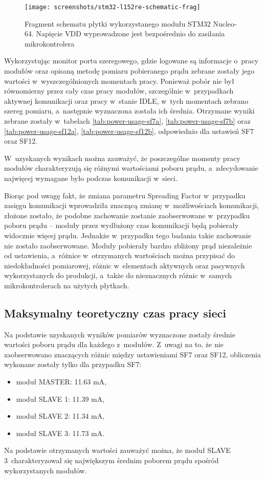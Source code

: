 \begin{figure}[!htbp]
    \centering
    \texttt{[image: screenshots/stm32-l152re-schematic-frag]}
    \caption{\label{img:stm32-l152re-schematic-frag}Fragment schematu płytki wykorzystanego modułu STM32 Nucleo-64.
        Napięcie VDD wyprowadzone jest bezpośrednio do zasilania mikrokontrolera}
\end{figure}

\FloatBarrier

Wykorzystując monitor portu szeregowego, gdzie logowane są informacje o~pracy modułów oraz opisaną metodę pomiaru
pobieranego prądu zebrane zostały jego wartości w~wyszczególnionych momentach pracy. Ponieważ pobór nie był równomierny
przez cały czas pracy modułów, szczególnie w~przypadkach aktywnej komunikacji oraz pracy w~stanie IDLE, w~tych momentach
zebrano szereg pomiaru, a~następnie wyznaczona została ich średnia. Otrzymane wyniki zebrane zostały w~tabelach
\ref{tab:power-usage-sf7a}, \ref{tab:power-usage-sf7b} oraz \ref{tab:power-usage-sf12a}, \ref{tab:power-usage-sf12b},
odpowiednio dla ustawień SF7 oraz SF12.




\FloatBarrier
W~uzyskanych wynikach można zauważyć, że poszczególne momenty pracy modułów charakteryzują się różnymi wartościami
poboru prądu, a~zdecydowanie najwięcej wymagane było podczas komunikacji w~sieci.

Biorąc pod uwagę fakt, że zmiana parametru Spreading Factor w~przypadku zasięgu komunikacji wprowadziła znaczącą zmianę
w~możliwościach komunikacji, złożone zostało, że podobne zachowanie zostanie zaobserwowane w~przypadku poboru prądu --
moduły przez wydłużony czas komunikacji będą pobierały widocznie więcej prądu. Jednakże w~przypadku tego badania takie
zachowanie nie zostało zaobserwowane. Moduły pobierały bardzo zbliżony prąd niezależnie od ustawienia, a~różnice
w~otrzymanych wartościach można przypisać do niedokładności pomiarowej, różnic w~elementach aktywnych oraz pasywnych
wykorzystanych do produkcji, a~także do nieznacznych różnic w~samych mikrokontrolerach na użytych płytkach.

\subsection{\label{sect:network-work-on-battery}Maksymalny teoretyczny czas pracy sieci} Na podstawie uzyskanych wyników
pomiarów wyznaczone zostały średnie wartości poboru prądu dla każdego z~modułów. Z~uwagi na to, że nie zaobserwowano
znaczących różnic między ustawieniami SF7 oraz SF12, obliczenia wykonane zostały tylko dla przypadku SF7:
\begin{itemize}[label=--]
    \item moduł MASTER: 11.63 mA,
    \item moduł SLAVE 1: 11.39 mA,
    \item moduł SLAVE 2: 11.34 mA,
    \item moduł SLAVE 3: 11.73 mA.
\end{itemize}
Na podstawie otrzymanych wartości zauważyć można, że moduł SLAVE 3~charakteryzował się największym średnim poborem prądu
spośród wykorzystanych modułów.

